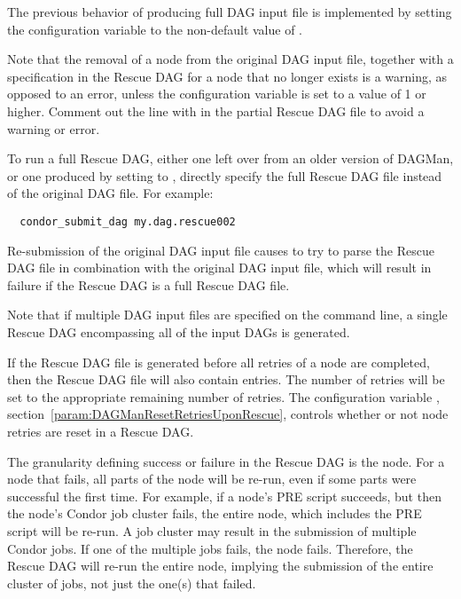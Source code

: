 The previous behavior of producing full DAG input file 
is implemented by setting the configuration variable
 to the non-default 
value of .  

Note that the removal of a node from the original DAG input file, 
together with a  specification in the Rescue DAG 
for a node that no longer exists is a warning,
as opposed to an error, 
unless the  configuration
variable is set to a value of 1 or higher.  
Comment out the line with  in the partial Rescue DAG file
to avoid a warning or error.

To run a full Rescue DAG,
either one left over from an older version of DAGMan, 
or one produced by setting  
to , 
directly specify the full Rescue DAG file instead of the original DAG file.
For example:

\begin{verbatim}
  condor_submit_dag my.dag.rescue002
\end{verbatim}

Re-submission of the original DAG input file causes  to try to
parse the Rescue DAG file in combination with the original DAG input file, 
which will result in failure if the Rescue DAG is a full Rescue DAG file.

Note that if multiple DAG input files are specified on the
 command line,
a single Rescue DAG encompassing all of the input DAGs is generated.

If the Rescue DAG file is generated before all retries
of a node are completed, 
then the Rescue DAG file will also contain  entries.
The number of retries will be set to the appropriate remaining
number of retries.
The configuration variable , 
section~\ref{param:DAGManResetRetriesUponRescue},
controls whether or not node retries are reset in a Rescue DAG.

The granularity defining success or failure
in the Rescue DAG is the node.
For a node that fails,
all parts of the node will be re-run,
even if some parts were successful the first time.
For example, if a node's PRE script
succeeds, but then the node's Condor job cluster fails,
the entire node, which includes the PRE script will be re-run.
A job cluster may result in the submission of multiple Condor jobs.
If one of the multiple jobs fails, the node fails.
Therefore, the Rescue DAG will
re-run the entire node,
implying the submission of the entire cluster of jobs,
not just the one(s) that failed.

